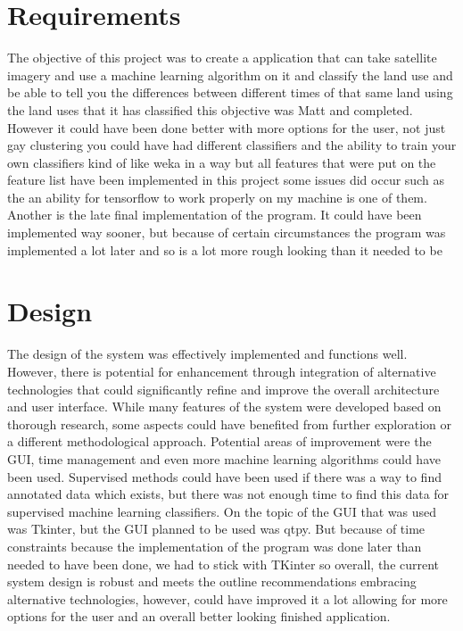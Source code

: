 \section{Requirements}\label{sec:requirements}

The objective of this project was to create a application that can take satellite imagery and use a machine learning algorithm on it and
classify the land use and be able to tell you the differences between
different times of that same land using the land uses that it has classified this objective was Matt and completed.
However it could have been done better with more options for the user, not just gay clustering you could have had different classifiers and the ability to train your own classifiers kind of like weka in a
way but all features that were put on the feature list have been implemented in this project some issues did occur such as the an ability for tensorflow to work properly on my machine is one of them.
Another is the late final implementation of the program.
It could have been implemented way sooner,
but because of certain circumstances the program was implemented a lot later and so is a lot more rough looking than it needed to be

\section{Design}\label{sec:design}

The design of the system was effectively implemented and functions well. 
However, there is potential for enhancement through integration of alternative technologies that could significantly refine and improve the overall architecture and user interface.
While many features of the system were developed based on thorough research, some aspects could have benefited from further exploration or a different methodological approach. 
Potential areas of improvement were the GUI, time management and even more machine learning algorithms could have been used.
Supervised methods could have been used if there was a way to find annotated data which exists,
but there was not enough time to find this data for supervised machine learning classifiers.
On the topic of the GUI that was used was Tkinter, but the GUI planned to be used was qtpy.
But because of time constraints because the implementation of the program was done later than needed to have been done, we had to stick with TKinter so overall, the current system design is robust and meets the outline recommendations embracing alternative technologies, however, could have improved it a lot allowing for more options for the user and an overall better looking finished application.


